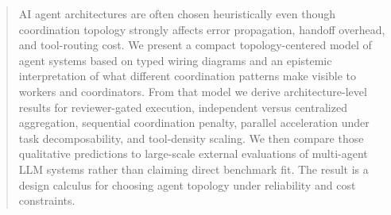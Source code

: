 \begin{abstract}
AI agent architectures are often chosen heuristically even though coordination topology strongly affects
error propagation, handoff overhead, and tool-routing cost. We present a compact topology-centered model
of agent systems based on typed wiring diagrams and an epistemic interpretation of what different
coordination patterns make visible to workers and coordinators. From that model we derive
architecture-level results for reviewer-gated execution, independent versus centralized aggregation,
sequential coordination penalty, parallel acceleration under task decomposability, and tool-density
scaling. We then compare those qualitative predictions to large-scale external evaluations of multi-agent
LLM systems rather than claiming direct benchmark fit. The result is a design calculus for choosing agent
topology under reliability and cost constraints.
\end{abstract}
